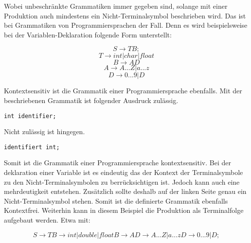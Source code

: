 \pagebreak

Wobei unbeschränkte Grammatiken immer gegeben sind, solange mit einer Produktion auch mindestens ein Nicht-Terminalsymbol beschrieben wird. Das ist bei Grammatiken von Programmiersprachen der Fall. Denn es wird beispielsweise bei der Variablen-Deklaration folgende Form unterstellt:

\begin{center}
\begin{equation}
S \to TB;
\end{equation}
\begin{equation}
T \to int | char | float
\end{equation}
\begin{equation}
B \to AD
\end{equation}
\begin{equation}
A \to A...Z|a...z
\end{equation}
\begin{equation}
D \to 0...9|D
\end{equation}
\end{center}
 
Kontextsensitiv ist die Grammatik einer Programmiersprache ebenfalls. Mit der beschriebenen Grammatik ist folgender Ausdruck zulässig.
\begin{verbatim}
int identifier;
\end{verbatim}

Nicht zulässig ist hingegen.

\begin{verbatim} 
identifiert int; 
\end{verbatim}
Somit ist die Grammatik einer Programmiersprache kontextsensitiv. 
Bei der deklaration einer Variable ist es eindeutig das der Kontext der Terminalsymbole zu den Nicht-Terminalsymbolen zu berrücksichtigen ist. Jedoch kann auch eine mehrdeutigkeit entstehen. Zusätzlich sollte deshalb auf der linken Seite genau ein Nicht-Terminalsymbol stehen. Somit ist die definierte Grammatik ebenfalls Kontextfrei. 
Weiterhin kann in diesem Beispiel die Produktion als Terminalfolge aufgebaut werden. Etwa mit: 

\begin{center}
\begin{equation}
S \to TB \to int | double | float B \to AD \to A...Z|a...z D \to 0...9|D;
\end{equation}
\end{center}

